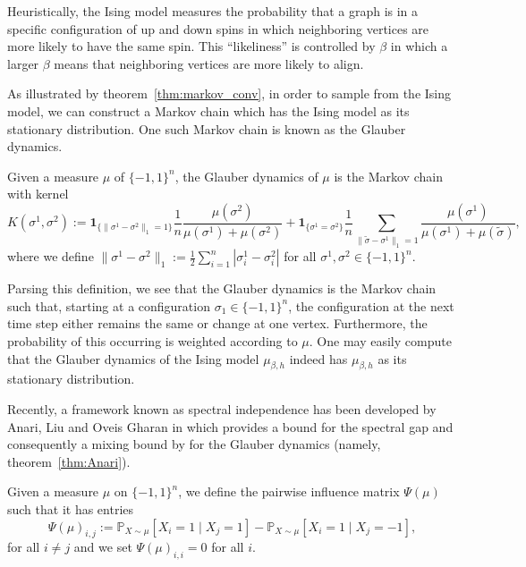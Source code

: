 Heuristically, the Ising model measures the probability that a graph is in a specific configuration of 
up and down spins in which neighboring vertices are more likely to have the same spin. This ``likeliness'' 
is controlled by \(\beta\) in which a larger \(\beta\) means that neighboring vertices are more likely to
align. 

As illustrated by theorem~\ref{thm:markov_conv}, in order to sample from the Ising model, we can 
construct a Markov chain which has the Ising model as its stationary distribution. One such Markov chain 
is known as the Glauber dynamics.

\begin{definition}
  Given a measure \(\mu\) of \(\{-1, 1\}^n\), the Glauber dynamics of \(\mu\) is the Markov chain 
  with kernel 
  \begin{equation}\label{eq:glauber_ker}
    K(\sigma^1, \sigma^2) := 
      \mathbf{1}_{\{\|\sigma^1 - \sigma^2\|_1 = 1\}}\frac{1}{n}\frac{\mu(\sigma^2)}{\mu(\sigma^1) + \mu(\sigma^2)}
    + \mathbf{1}_{\{\sigma^1 = \sigma^2\}} \frac{1}{n}\sum_{\|\tilde \sigma - \sigma^1\|_1 = 1}
    \frac{\mu(\sigma^1)}{\mu(\sigma^1) + \mu(\tilde \sigma)},
  \end{equation}
  where we define \(\|\sigma^1 - \sigma^2\|_1 := \frac{1}{2}\sum_{i = 1}^n |\sigma_i^1 - \sigma_i^2|\) 
  for all \(\sigma^1, \sigma^2 \in \{-1, 1\}^n\).
\end{definition}

Parsing this definition, we see that the Glauber dynamics is the Markov chain such that, starting at a 
configuration \(\sigma_1 \in \{-1, 1\}^n\), the configuration at the next time step either remains the 
same or change at one vertex. Furthermore, the probability of this occurring is weighted according to 
\(\mu\). One may easily compute that the Glauber dynamics of the Ising model \(\mu_{\beta, h}\) indeed 
has \(\mu_{\beta, h}\) as its stationary distribution.

Recently, a framework known as spectral independence has been developed by Anari, Liu and Oveis Gharan in 
\cite{Anari_2020} which provides a bound for the spectral gap and consequently a mixing bound by 
for the Glauber dynamics (namely, theorem~\ref{thm:Anari}). 

\begin{definition}
  Given a measure \(\mu\) on \(\{-1, 1\}^n\), we define the pairwise influence matrix \(\Psi(\mu)\) 
  such that it has entries 
  \[\Psi(\mu)_{i, j} := \mathbb{P}_{X \sim \mu}[X_i = 1 \mid X_j = 1] - \mathbb{P}_{X \sim \mu}[X_i = 1 \mid X_j = -1],\]
  for all \(i \neq j\) and we set \(\Psi(\mu)_{i, i} = 0\) for all \(i\).
\end{definition}

